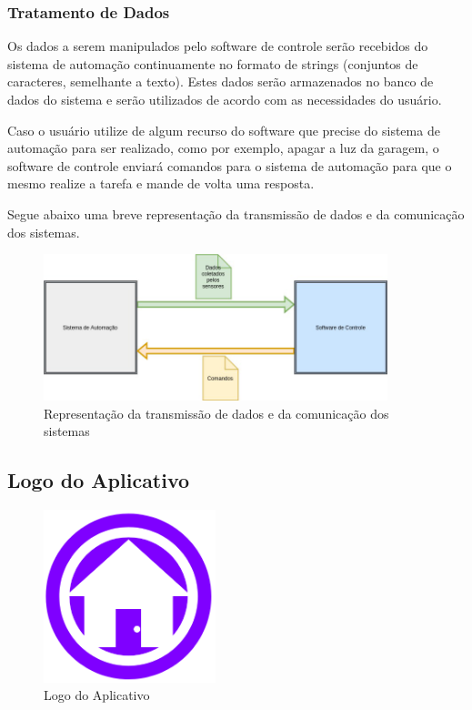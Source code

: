 \subsubsection{Tratamento de Dados}
\par Os dados a serem manipulados pelo software de controle serão recebidos do sistema de automação continuamente no formato de strings (conjuntos de caracteres, semelhante a texto). Estes dados serão armazenados no banco de dados do sistema e serão utilizados de acordo com as necessidades do usuário.
\par Caso o usuário utilize de algum recurso do software que precise do sistema de automação para ser realizado, como por exemplo, apagar a luz da garagem, o software de controle enviará comandos para o sistema de automação para que o mesmo realize a tarefa e mande de volta uma resposta.
\par Segue abaixo uma breve representação da transmissão de dados e da comunicação dos sistemas.

\begin{figure}[!h]
\centering
\caption{Representação da transmissão de dados e da comunicação dos sistemas}
\includegraphics[width=10cm]{figuras/componentes}
\end{figure}

\subsection{Logo do Aplicativo}

\begin{figure}[!h]
\centering
\caption{Logo do Aplicativo}
\includegraphics[width=5cm]{figuras/pi1}
\end{figure}

